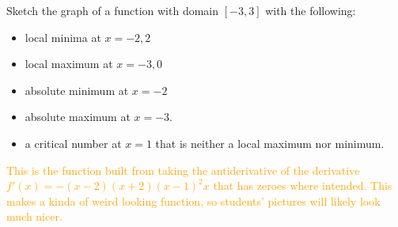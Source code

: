 \documentclass{ximera}
\begin{document}
\begin{exercise}
    Sketch the graph of a function with domain $[-3,3]$ with the following: 
    \begin{itemize}
        \item local minima at $x=-2, 2$
        \item local maximum at $x=-3, 0$
        \item absolute minimum at $x=-2$
        \item absolute maximum at $x=-3$.
        \item a critical number at $x=1$ that is neither a local maximum nor minimum.
    \end{itemize}

    \begin{image}
    \end{image}
    \textcolor{orange}{This is the function built from taking the antiderivative of the derivative $f'(x)=-(x-2)(x+2)(x-1)^2x$ that has zeroes where intended.  This makes a kinda of weird looking function, so students' pictures will likely look much nicer.}
\end{exercise}
\end{document}
